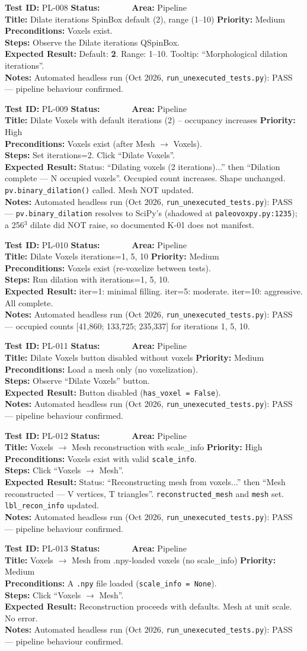 \documentclass[12pt,a4paper]{article}
\newcommand{\statuspass}{\colorbox{statusgreen}{\textcolor{white}{\textbf{\,PASS\,}}}}
\newcommand{\testcase}[9]{%
  \smallskip
  \noindent\textbf{Test ID:} #1 \hfill \textbf{Status:} #2 \hfill \textbf{Area:} #3 \\
  \textbf{Title:} #4 \hfill \textbf{Priority:} #5 \\[0.3em]
  \textbf{Preconditions:} #6 \\[0.3em]
  \textbf{Steps:} #7 \\[0.3em]
  \textbf{Expected Result:} #8 \\
  \textbf{Notes:} #9
  \smallskip
}
\begin{document}
\testcase{PL-008}{\statuspass}{Pipeline}{Dilate iterations SpinBox default (2), range (1--10)}{Medium}{Voxels exist.}{Observe the Dilate iterations QSpinBox.}{Default: \textbf{2}. Range: 1--10. Tooltip: ``Morphological dilation iterations''.}{Automated headless run (Oct 2026, \texttt{run\_unexecuted\_tests.py}): PASS --- pipeline behaviour confirmed.}


\testcase{PL-009}{\statuspass}{Pipeline}{Dilate Voxels with default iterations (2) -- occupancy increases}{High}{Voxels exist (after Mesh $\rightarrow$ Voxels).}{Set iterations=2. Click ``Dilate Voxels''.}{Status: ``Dilating voxels (2 iterations)...'' then ``Dilation complete --- N occupied voxels''. Occupied count increases. Shape unchanged. \texttt{pv.binary\_dilation()} called. Mesh NOT updated.}{Automated headless run (Oct 2026, \texttt{run\_unexecuted\_tests.py}): PASS --- \texttt{pv.binary\_dilation} resolves to SciPy's (shadowed at \texttt{paleovoxpy.py:1235}); a 256$^3$ dilate did NOT raise, so documented K-01 does not manifest.}


\testcase{PL-010}{\statuspass}{Pipeline}{Dilate Voxels iterations=1, 5, 10}{Medium}{Voxels exist (re-voxelize between tests).}{Run dilation with iterations=1, 5, 10.}{iter=1: minimal filling. iter=5: moderate. iter=10: aggressive. All complete.}{Automated headless run (Oct 2026, \texttt{run\_unexecuted\_tests.py}): PASS --- occupied counts [41,860; 133,725; 235,337] for iterations 1, 5, 10.}


\testcase{PL-011}{\statuspass}{Pipeline}{Dilate Voxels button disabled without voxels}{Medium}{Load a mesh only (no voxelization).}{Observe ``Dilate Voxels'' button.}{Button disabled (\texttt{has\_voxel = False}).}{Automated headless run (Oct 2026, \texttt{run\_unexecuted\_tests.py}): PASS --- pipeline behaviour confirmed.}


\testcase{PL-012}{\statuspass}{Pipeline}{Voxels $\rightarrow$ Mesh reconstruction with scale\_info}{High}{Voxels exist with valid \texttt{scale\_info}.}{Click ``Voxels $\rightarrow$ Mesh''.}{Status: ``Reconstructing mesh from voxels...'' then ``Mesh reconstructed --- V vertices, T triangles''. \texttt{reconstructed\_mesh} and \texttt{mesh} set. \texttt{lbl\_recon\_info} updated.}{Automated headless run (Oct 2026, \texttt{run\_unexecuted\_tests.py}): PASS --- pipeline behaviour confirmed.}


\testcase{PL-013}{\statuspass}{Pipeline}{Voxels $\rightarrow$ Mesh from .npy-loaded voxels (no scale\_info)}{Medium}{A \texttt{.npy} file loaded (\texttt{scale\_info = None}).}{Click ``Voxels $\rightarrow$ Mesh''.}{Reconstruction proceeds with defaults. Mesh at unit scale. No error.}{Automated headless run (Oct 2026, \texttt{run\_unexecuted\_tests.py}): PASS --- pipeline behaviour confirmed.}
\end{document}
